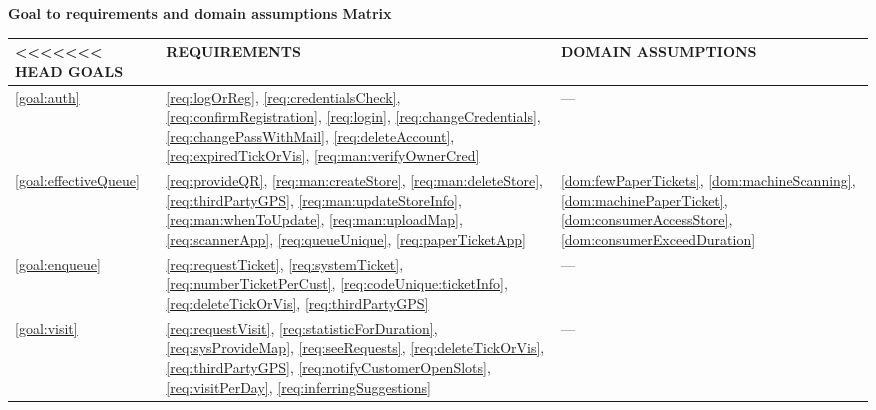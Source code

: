 \documentclass[a4paper, 12pt, oneside]{article}
\begin{document}
\newpage
\label{uc:gToReDMatrix}
\begin{center}
{\textbf{Goal to requirements and domain assumptions Matrix}}
\end{center}

\begin{tabularx}{\linewidth}{| p{20mm} | p{50mm} | p{50mm} |}

     \hline
<<<<<<< HEAD
    GOALS & REQUIREMENTS & DOMAIN ASSUMPTIONS \\
    \hline 
    \ref{goal:auth} & \ref{req:logOrReg}, \ref{req:credentialsCheck}, \ref{req:confirmRegistration}, \ref{req:login}, \ref{req:changeCredentials}, \ref{req:changePassWithMail}, \ref{req:deleteAccount}, \ref{req:expiredTickOrVis}, \ref{req:man:verifyOwnerCred} & --- \\
    
    \hline 
    \ref{goal:effectiveQueue} & \ref{req:provideQR}, \ref{req:man:createStore}, \ref{req:man:deleteStore},  \ref{req:thirdPartyGPS}, \ref{req:man:updateStoreInfo}, \ref{req:man:whenToUpdate}, \ref{req:man:uploadMap}, \ref{req:scannerApp}, \ref{req:queueUnique}, \ref{req:paperTicketApp} & \ref{dom:fewPaperTickets}, \ref{dom:machineScanning}, \ref{dom:machinePaperTicket}, \ref{dom:consumerAccessStore}, \ref{dom:consumerExceedDuration} \\
    
    \hline
    \ref{goal:enqueue} & \ref{req:requestTicket}, \ref{req:systemTicket}, \ref{req:numberTicketPerCust}, \ref{req:codeUnique:ticketInfo}, \ref{req:deleteTickOrVis}, \ref{req:thirdPartyGPS} & ---  \\

    \hline
    
    \ref{goal:visit} & \ref{req:requestVisit}, \ref{req:statisticForDuration}, \ref{req:sysProvideMap}, \ref{req:seeRequests}, \ref{req:deleteTickOrVis}, \ref{req:thirdPartyGPS}, \ref{req:notifyCustomerOpenSlots}, \ref{req:visitPerDay}, \ref{req:inferringSuggestions}  & ---  \\

    \hline
    
\end{tabularx}
\end{document}
